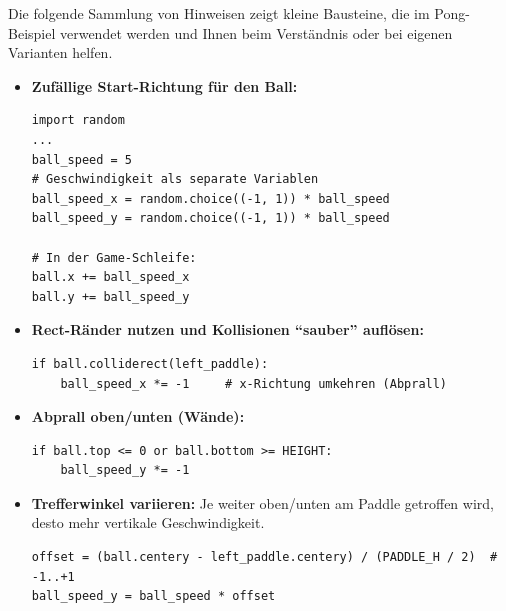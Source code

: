 \begin{myattention}
    Die folgende Sammlung von Hinweisen zeigt kleine Bausteine, die im Pong-Beispiel verwendet werden und Ihnen beim Verständnis oder bei eigenen Varianten helfen.

    \begin{itemize}

        \item \textbf{Zufällige Start-Richtung für den Ball:}
              \begin{lstlisting}
import random
...
ball_speed = 5
# Geschwindigkeit als separate Variablen
ball_speed_x = random.choice((-1, 1)) * ball_speed
ball_speed_y = random.choice((-1, 1)) * ball_speed

# In der Game-Schleife:
ball.x += ball_speed_x
ball.y += ball_speed_y
\end{lstlisting}

        \item \textbf{Rect-Ränder nutzen und Kollisionen \enquote{sauber} auflösen:}
              \begin{lstlisting}
if ball.colliderect(left_paddle):
    ball_speed_x *= -1     # x-Richtung umkehren (Abprall)
\end{lstlisting}

        \item \textbf{Abprall oben/unten (Wände):}
              \begin{lstlisting}
if ball.top <= 0 or ball.bottom >= HEIGHT:
    ball_speed_y *= -1
\end{lstlisting}

        \item \textbf{Trefferwinkel variieren:} Je weiter oben/unten am Paddle getroffen wird, desto mehr vertikale Geschwindigkeit.
              \begin{lstlisting}
offset = (ball.centery - left_paddle.centery) / (PADDLE_H / 2)  # -1..+1
ball_speed_y = ball_speed * offset
\end{lstlisting}

              \begin{center}
\end{center}
\end{itemize}
\end{myattention}

